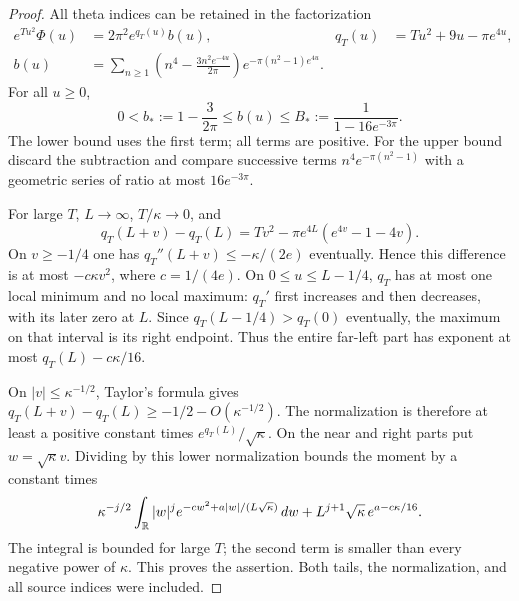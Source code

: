 \begin{proof}
All theta indices can be retained in the factorization
\begin{align*}
 e^{Tu^2}\Phi(u)&=2\pi^2 e^{q_T(u)}b(u),&
 q_T(u)&=Tu^2+9u-\pi e^{4u},\\
 b(u)&=\sum_{n\ge1}\left(n^4-\frac{3n^2e^{-4u}}{2\pi}\right)
          e^{-\pi(n^2-1)e^{4u}}.
\end{align*}
For all $u\ge0$,
\begin{equation}
 0<b_*:=1-\frac3{2\pi}\le b(u)
 \le B_*:=\frac1{1-16e^{-3\pi}}.
 \label{eq:sourcebounds}
\end{equation}
The lower bound uses the first term; all terms are positive. For
the upper bound discard the subtraction and compare successive terms
$n^4e^{-\pi(n^2-1)}$ with a geometric series of ratio at most
$16e^{-3\pi}$.

For large $T$, $L\to\infty$, $T/\kappa\to0$, and
\[
 q_T(L+v)-q_T(L)=Tv^2-\pi e^{4L}(e^{4v}-1-4v).
\]
On $v\ge-1/4$ one has $q_T''(L+v)\le-\kappa/(2e)$
eventually. Hence this difference is at most
$-c\kappa v^2$, where $c=1/(4e)$.
On $0\le u\le L-1/4$, $q_T$ has at most one local minimum and
no local maximum: $q_T'$ first increases and then decreases, with
its later zero at $L$. Since $q_T(L-1/4)>q_T(0)$ eventually,
the maximum on that interval is its right endpoint. Thus the entire
far-left part has exponent at most $q_T(L)-c\kappa/16$.

On $|v|\le\kappa^{-1/2}$, Taylor's formula gives
$q_T(L+v)-q_T(L)\ge-1/2-O(\kappa^{-1/2})$.
The normalization is therefore at least a positive constant times
$e^{q_T(L)}/\sqrt\kappa$. On the near and right parts put
$w=\sqrt\kappa v$. Dividing by this lower normalization bounds
the moment by a constant times
\[
 \kappa^{-j/2}\int_\mathbb R |w|^j
 e^{-cw^2+a|w|/(L\sqrt\kappa)}\,d w
 +L^{j+1}\sqrt\kappa\,e^{a-c\kappa/16}.
\]
The integral is bounded for large $T$; the second term is smaller
than every negative power of $\kappa$. This proves the assertion.
Both tails, the normalization, and all source indices were included.
\end{proof}

